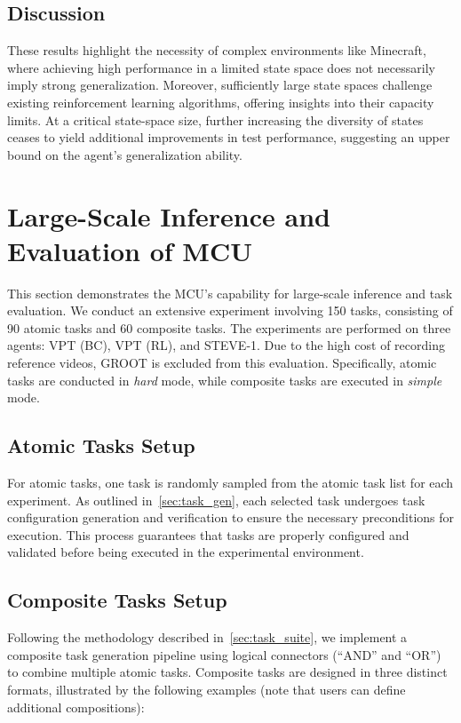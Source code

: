 \subsection{Discussion}
These results highlight the necessity of complex environments like Minecraft, where achieving high performance in a limited state space does not necessarily imply strong generalization. Moreover, sufficiently large state spaces challenge existing reinforcement learning algorithms, offering insights into their capacity limits. At a critical state-space size, further increasing the diversity of states ceases to yield additional improvements in test performance, suggesting an upper bound on the agent’s generalization ability.


\newpage


\section{Large-Scale Inference and Evaluation of MCU}
\label{app:batch_inference}

This section demonstrates the MCU's capability for large-scale inference and task evaluation. We conduct an extensive experiment involving 150 tasks, consisting of 90 atomic tasks and 60 composite tasks. The experiments are performed on three agents: VPT (BC), VPT (RL), and STEVE-1. Due to the high cost of recording reference videos, GROOT is excluded from this evaluation. Specifically, atomic tasks are conducted in \emph{hard} mode, while composite tasks are executed in \emph{simple} mode.

\subsection{Atomic Tasks Setup}
For atomic tasks, one task is randomly sampled from the atomic task list for each experiment. As outlined in~\cref{sec:task_gen}, each selected task undergoes task configuration generation and verification to ensure the necessary preconditions for execution. This process guarantees that tasks are properly configured and validated before being executed in the experimental environment.

\subsection{Composite Tasks Setup}
\label{app:compose_pipeline}
Following the methodology described in~\cref{sec:task_suite}, we implement a composite task generation pipeline using logical connectors (``AND'' and ``OR'') to combine multiple atomic tasks. Composite tasks are designed in three distinct formats, illustrated by the following examples (note that users can define additional compositions):

